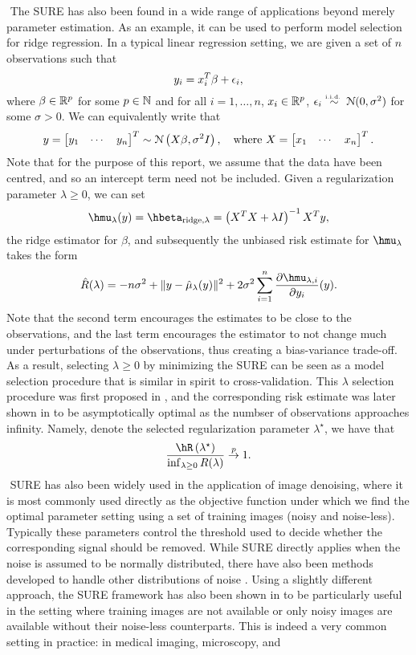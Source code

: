 $ $\newline
The SURE has also been found in a wide range of applications beyond merely parameter estimation. As an example, it can be used to perform model selection for ridge regression. In a typical linear regression setting, we are given a set of $n$ observations such that
\[
y_i = x_i^T\beta + \epsilon_i,
\]
where $\beta\in\mathbb{R}^p$ for some $p\in\mathbb{N}$ and for all $i=1,\dots,n$, $x_i\in\mathbb{R}^p$, $\epsilon_i\overset{\textrm{\tiny i.i.d.\ }}{\sim} \mathcal{N}(0,\sigma^2)$ for some $\sigma>0$. We can equivalently write that
\[
y = \begin{bmatrix} y_1 & \cdots & y_n \end{bmatrix}^T \sim \mathcal{N}\left(X\beta, \sigma^2I \right), \quad \text{where } X = \begin{bmatrix} x_1 & \cdots & x_n \end{bmatrix}^T.
\]
Note that for the purpose of this report, we assume that the data have been centred, and so an intercept term need not be included. Given a regularization parameter $\lambda\geq0$, we can set
\[
\hmu_\lambda(y) = \hbeta_{\text{ridge}, \lambda} = \left( X^TX + \lambda I \right)^{-1}X^Ty,
\]
the ridge estimator for $\beta$, and subsequently the unbiased risk estimate for $\hmu_\lambda$ takes the form
\[
\hat{R}(\lambda) = -n\sigma^2 + \| y - \hat{\mu}_\lambda(y) \|^2 + 2\sigma^2\sum_{i=1}^n \frac{\partial \hmu_{\lambda,i}}{\partial y_i}(y).
\]
Note that the second term encourages the estimates to be close to the observations, and the last term encourages the estimator to not change much under perturbations of the observations, thus creating a bias-variance trade-off. As a result, selecting $\lambda\geq0$ by minimizing the SURE can be seen as a model selection procedure that is similar in spirit to cross-validation. This $\lambda$ selection procedure was first proposed in \citet{10.2307/1267380}, and the corresponding risk estimate was later shown in \citet{li1986asymptotic} to be asymptotically optimal as the numbser of observations approaches infinity. Namely, denote the selected regularization parameter $\lambda^\star$, we have that
\[
\frac{\hR\left(\lambda^\star\right)}{\inf_{\lambda\geq0}R(\lambda)} \convp 1.
\]
$ $\newline
SURE has also been widely used in the application of image denoising, where it is most commonly used directly as the objective function under which we find the optimal parameter setting using a set of training images (noisy and noise-less). Typically these parameters control the threshold used to decide whether the corresponding signal should be removed. While SURE directly applies when the noise is assumed to be normally distributed, there have also been methods developed to handle other distributions of noise \citep{donoho1995adapting,luisier2010image,panisetti2014unbiased}. Using a slightly different approach, the SURE framework has also been shown in \citet{metzler2018unsupervised} to be particularly useful in the setting where training images are not available or only noisy images are available without their noise-less counterparts. This is indeed a very common setting in practice: in medical imaging, microscopy, and
